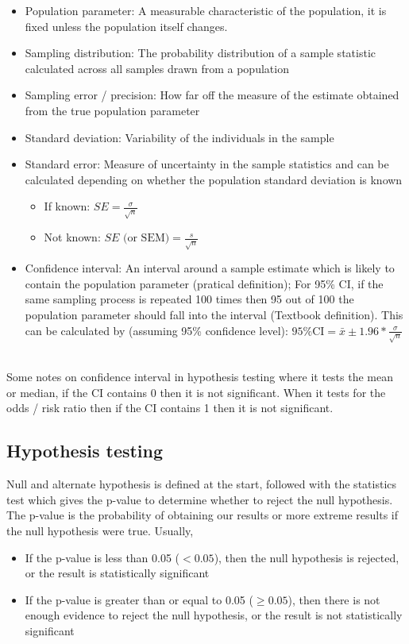 \documentclass{article}
\begin{document}
\begin{itemize}
    \item Population parameter: A measurable characteristic of the population, it is fixed unless the population itself changes. 
    \item Sampling distribution: The probability distribution of a sample statistic calculated across all samples drawn from a population
    \item Sampling error / precision: How far off the measure of the estimate obtained from the true population parameter
    \item Standard deviation: Variability of the individuals in the sample
    \item Standard error: Measure of uncertainty in the sample statistics and can be calculated depending on whether the population standard deviation is known
        \begin{itemize}
            \item If known: $SE = \frac{\sigma}{\sqrt{n}}$
            \item Not known: $SE \text{ (or SEM)} = \frac{s}{\sqrt{n}}$
        \end{itemize}
    \item Confidence interval: An interval around a sample estimate which is likely to contain the population parameter (pratical definition); For 95\% CI, if the same sampling process is repeated 100 times then 95 out of 100 the population parameter should fall into the interval (Textbook definition). This can be calculated by (assuming 95\% confidence level): $\text{95\% CI} = \bar{x} \pm 1.96 * \frac{\sigma}{\sqrt{n}}$
\end{itemize}
\mbox{}\\
Some notes on confidence interval in hypothesis testing where it tests the mean or median, if the CI contains 0 then it is not significant. When it tests for the odds / risk ratio then if the CI contains 1 then it is not significant.

\subsection{Hypothesis testing}
Null and alternate hypothesis is defined at the start, followed with the statistics test which gives the p-value to determine whether to reject the null hypothesis. The p-value is the probability of obtaining our results or more extreme results if the null hypothesis were true. Usually,
\begin{itemize}
    \item If the p-value is less than 0.05 ($< 0.05$), then the null hypothesis is rejected, or the result is statistically significant
    \item If the p-value is greater than or equal to 0.05 ($\geq 0.05$), then there is not enough evidence to reject the null hypothesis, or the result is not statistically significant
\end{itemize}
\end{document}

